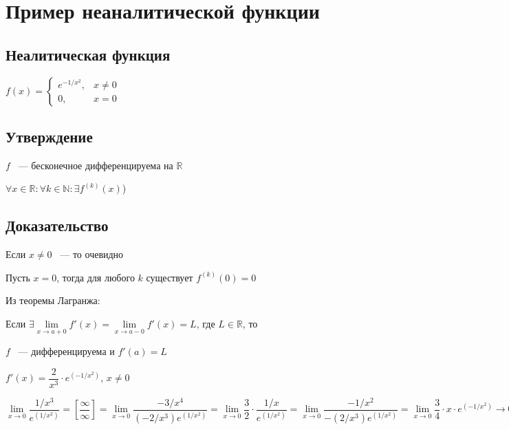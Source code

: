\documentclass{article}
\begin{document}
	\newpage
	
	\section{Пример неаналитической функции}
	
		\subsection{Неалитическая функция}
		
			$f(x) = \begin{cases} e^{-1 / x^2}, & x \neq 0 \\ 0, & x = 0 \end{cases}$
			
		\subsection{Утверждение}
		
			$f$ ~--- бесконечное дифференцируема на $\mathbb{R}$
			
			$\forall x \in \mathbb{R} : \forall k \in \mathbb{N} : \exists f^{(k)} (x)$)
			
		\subsection{Доказательство}
		
			Если $x \neq 0$ ~--- то очевидно
			
			Пусть $x = 0$, тогда для любого $k$ существует $f^{(k)} (0) = 0$
			
			Из теоремы Лагранжа:
			
			Если $\exists \lim\limits_{x \rightarrow a + 0} f'(x) = \lim\limits_{x \rightarrow a - 0} f'(x) = L$, где $L \in \mathbb{R}$, то
			
			$f$ ~--- дифференцируема и $f'(a) = L$
			
			$f'(x) = \dfrac{2}{x^3} \cdot e^{\left(-1 / x^2\right)}$, $x \neq 0$
			
			$\lim\limits_{x \rightarrow 0} \dfrac{1/x^3}{e^{\left(1 / x^2\right)}} = \left[ \dfrac{\infty}{\infty} \right] = \lim\limits_{x \rightarrow 0} \dfrac{-3/x^4}{(-2/ x^3) e^{\left( 1 /x^2\right)}} = \lim\limits_{x \rightarrow 0} \dfrac{3}{2} \cdot \dfrac{1 / x}{e^{\left( 1 / x^2 \right)}} = \lim\limits_{x \rightarrow 0} \dfrac{-1 / x^2}{-(2 / x^3) e^{\left(1 / x^2\right)}} = \lim\limits_{x \rightarrow 0} \dfrac{3}{4} \cdot x \cdot e^{\left(-1 / x^2\right)} \rightarrow 0$
			
\end{document}
